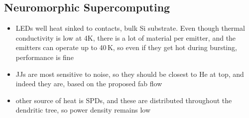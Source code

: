 \subsection{Neuromorphic Supercomputing}


\vspace{3em}
\begin{itemize}
\item LEDs well heat sinked to contacts, bulk Si substrate. Even though thermal conductivity is low at 4K, there is a lot of material per emitter, and the emitters can operate up to 40\,K, so even if they get hot during bursting, performance is fine
\item JJs are most sensitive to noise, so they should be closest to He at top, and indeed they are, based on the proposed fab flow
\item other source of heat is SPDs, and these are distributed throughout the dendritic tree, so power density remains low
\end{itemize}